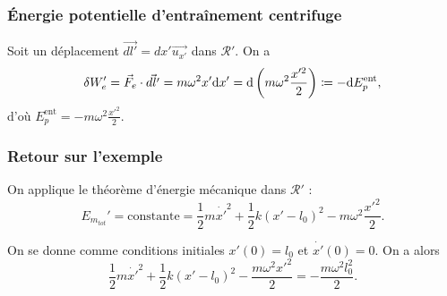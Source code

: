         \subsubsection{Énergie potentielle d'entraînement \og centrifuge\fg}
            
            Soit un déplacement $\vec{dl'}=dx'\vec{u_{x'}}$ dans $\mathcal{R}'$. On a 
            \begin{equation*}
                \delta W_{e}'=\vec{F}_e\cdot\vec{dl'}=m\omega^{2}x'\mathrm{d} x'=\mathrm{d}\left(m\omega^{2}\frac{x'^{2}}{2}\right)\coloneqq -\mathrm{d} E_p^{\text{ent}},
            \end{equation*}
            d'où $E_p^{\text{ent}}=-m\omega^{2}\frac{x'^{2}}{2}$.

        \subsubsection{Retour sur l'exemple}

            On applique le théorème d'énergie mécanique dans $\mathcal{R}'$ :
            \begin{equation*}
                E_{m_{tot}}'=\text{constante}=\frac{1}{2}m\dot{x'}^{2}+\frac{1}{2}k(x'-l_0)^{2}-m\omega^{2}\frac{x'^{2}}{2}.
            \end{equation*}

            On se donne comme conditions initiales $x'(0)=l_0$ et $\dot{x'}(0)=0$. On a alors 
            \begin{equation*}
                \boxed{
                    \frac{1}{2}m\dot{x'}^{2}+\frac{1}{2}k(x'-l_0)^{2}-\frac{m\omega^{2}x'^{2}}{2}=-\frac{m\omega^{2}l_0^{2}}{2}.
                }
            \end{equation*}

